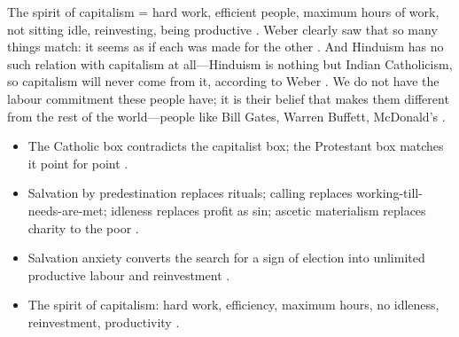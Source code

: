 \begin{KeyConcept}
The spirit of capitalism = hard work, efficient people, maximum hours of work, not sitting idle, reinvesting, being productive .
Weber clearly saw that so many things match: it seems as if each was made for the other .
And Hinduism has no such relation with capitalism at all---Hinduism is nothing but Indian Catholicism, so capitalism will never come from it, according to Weber . We do not have the labour commitment these people have; it is their belief that makes them different from the rest of the world---people like Bill Gates, Warren Buffett, McDonald's .
\end{KeyConcept}

\begin{QuickRevision}
\begin{itemize}
    \item The Catholic box contradicts the capitalist box; the Protestant box matches it point for point .
    \item Salvation by predestination replaces rituals; calling replaces working-till-needs-are-met; idleness replaces profit as sin; ascetic materialism replaces charity to the poor .
    \item Salvation anxiety converts the search for a sign of election into unlimited productive labour and reinvestment .
    \item The spirit of capitalism: hard work, efficiency, maximum hours, no idleness, reinvestment, productivity .
\end{itemize}
\end{QuickRevision}

